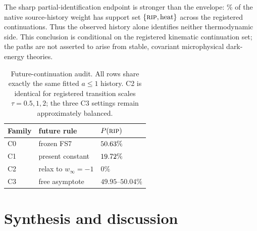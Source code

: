 \documentclass[a4paper,11pt]{article}
\begin{document}
The sharp partial-identification endpoint is stronger than the envelope:
\WPEightTwoSidedPct\% of the native source-history weight has support set
$\{\textsc{rip},\mathrm{heat}\}$ across the registered continuations. Thus the
observed history alone identifies neither thermodynamic side. This conclusion
is conditional on the registered kinematic continuation set; the paths are not
asserted to arise from stable, covariant microphysical dark-energy theories.

\begin{table}[!ht]
\caption{Future-continuation audit. All rows share exactly the same fitted
$a\le1$ history. C2 is identical for registered transition scales
$\tau=0.5,1,2$; the three C3 settings remain approximately balanced.}
\label{tab:continuations}
\begin{tabular}{lll}
Family & future rule & $P(\textsc{rip})$ \\
\hline
C0 & frozen FS7 & $50.63\%$ \\
C1 & present constant & $19.72\%$ \\
C2 & relax to $w_\infty=-1$ & $0\%$ \\
C3 & free asymptote & $49.95$--$50.04\%$ \\
\end{tabular}
\end{table}
\FloatBarrier

\section{Synthesis and discussion}\label{sec:summary}\label{sec:discussion}
\end{document}
